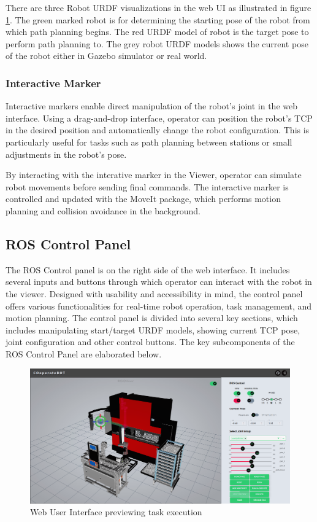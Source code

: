 There are three Robot URDF visualizations in the web UI as illustrated in figure \ref{fig:web-ui-preview}. The green marked robot is for determining the starting pose of the robot from which path planning begins. The red URDF model of robot is the target pose to perform path planning to. The grey robot URDF models shows the current pose of the robot either in Gazebo simulator or real world.

\subsubsection{Interactive Marker}
\label{subsubsec:web-ui-interactive-marker}
Interactive markers enable direct manipulation of the robot's joint in the web interface. Using a drag-and-drop interface, operator can position the robot's TCP in the desired position and automatically change the robot configuration. This is particularly useful for tasks such as path planning between stations or small adjustments in the robot's pose.

By interacting with the interative marker in the Viewer, operator can simulate robot movements before sending final commands. The interactive marker is controlled and updated with the MoveIt package, which performs motion planning and collision avoidance in the background.


\subsection{ROS Control Panel}
\label{subsec:web-ui-ros-control}
The ROS Control panel is on the right side of the web interface. It includes several inputs and buttons through which operator can interact with the robot in the viewer. Designed with usability and accessibility in mind, the control panel offers various functionalities for real-time robot operation, task management, and motion planning. The control panel is divided into several key sections, which includes manipulating start/target URDF models, showing current TCP pose, joint configuration and other control buttons. The key subcomponents of the ROS Control Panel are elaborated below.



\begin{figure}[h]
    \centering
    \includegraphics[width=1\textwidth]{figures/webui/web-ui-preview.png}
    \caption{Web User Interface previewing task execution}
    \label{fig:web-ui-preview}
\end{figure}

